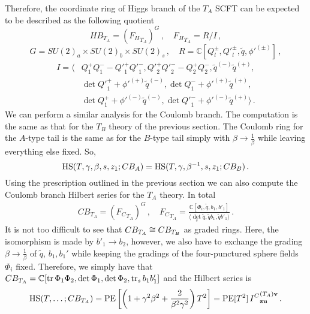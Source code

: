 \documentclass[main.tex]{subfiles}
\begin{document}
Therefore, the coordinate ring of Higgs branch of the $T_A$ SCFT can be expected to be described as the following quotient
\begin{equation}
HB_{T_A}=({F_H}_{T_A})^G\,,\quad {F_H}_{T_A}=R/I\,,
\end{equation}
\begin{equation}
G=SU(2)_{a}\times SU(2)_{b}\times SU(2)_s\,,\quad  R=\mathbb{C}[Q_{l}^{\pm},{Q'}_{l}^{\pm},\widetilde{q},{\phi'}^{(\pm)}]\,,
\end{equation}
\begin{equation}
\begin{aligned}I=\langle& Q_1^+Q_1^--{Q'}_1^+{Q'}_1^-,{Q'}_2^+{Q'}_2^--Q_2^+Q_2^-,\widetilde{q}^{(-)}\widetilde{q}^{(+)},\\
&\det {Q'}_1^++{\phi'}^{(+)}\widetilde{q}^{(-)},\det Q_1^-+{\phi'}^{(+)}\widetilde{q}^{(+)},\\
&\det Q_1^++{\phi'}^{(-)}\widetilde{q}^{(-)},\det {Q'}_1^-+{\phi'}^{(-)}\widetilde{q}^{(+)}\rangle\,. \end{aligned}
\end{equation}
We can perform a similar analysis for the Coulomb branch. The computation is the same as that for the $T_B$ theory of the previous section. The Coulomb ring for the $A$-type tail is the same as for the $B$-type tail simply with $\beta\to\frac{1}{\beta}$ while leaving everything else fixed. So,
\begin{equation}
\textrm{HS}(T,\gamma,\beta,s,z_1;CB_{A})=\textrm{HS}(T,\gamma,\beta^{-1},s,z_1;CB_{B})\,.
\end{equation}
Using the prescription outlined in the previous section we can also compute the Coulomb branch Hilbert series for the $T_A$ theory. In total
\begin{gather}
CB_{T_A}=({F_C}_{T_A})^G\,,\quad {F_C}_{T_A}=\frac{\mathbb{C}[\Phi_i,\widetilde{q},b_1,b'_1]}{\langle\det_s\widetilde{q},\widetilde{q}b_1,\widetilde{q}b'_1\rangle}\,.
\end{gather}
It is not too difficult to see that $CB_{T_A}\cong CB_{T_B}$ as graded rings. Here, the isomorphism is made by $b'_1\to b_2$, however, we also have to exchange the grading $\beta\to\frac{1}{\beta}$ of $\widetilde{q}$, $b_1,b_1'$ while keeping the gradings of the four-punctured sphere fields $\Phi_i$ fixed. Therefore, we simply have that \newline$CB_{T_A}=\mathbb{C}[\operatorname{tr}\Phi_1\Phi_2,\det\Phi_1,\det\Phi_2,\operatorname{tr}_sb_1b'_1]$ and the Hilbert series is
\begin{equation}
\textrm{HS}(T,\dots;CB_{T_A})=\operatorname{\mathrm{PE}}\left[\left(1+\gamma^2\beta^2+\frac{2}{\beta^2\gamma^2}\right)T^2\right]=\operatorname{\mathrm{PE}}[T^2]\,{I^C}  ^{(T_A)\mathbf{v}}_{\mathbf{z}\mathbf{u}}\,.
\end{equation}
\end{document}

